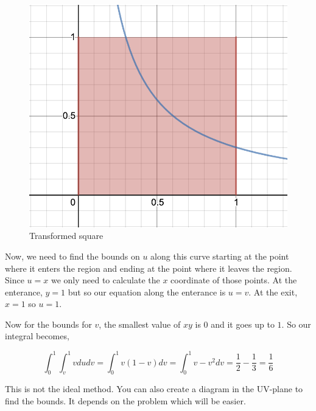 \begin{figure}[ht!]
    \centering
    \includegraphics[scale=0.5]{./images/lecture_14_figure_4.png}
    \caption{Transformed square}
\end{figure}

\pagebreak

Now, we need to find the bounds on $u$ along this curve starting at the point where it enters the region
and ending at the point where it leaves the region.
Since $u = x$ we only need to calculate the $x$ coordinate of those points.
At the enterance, $y = 1$ but  so our equation along the enterance is $u = v$.
At the exit, $x = 1$ so  $u = 1$.

Now for the bounds for $v$, the smallest value of $xy$ is $0$ and it goes up to $1$.
So our integral becomes, 

$$
\int_0^1 \int_v^1 v du dv  
    = \int_0^1 v(1-v) dv 
    = \int_0^1 v - v^2 dv 
    = \frac{1}{2} - \frac{1}{3} 
    = \frac{1}{6}
$$

This is not the ideal method. You can also create a diagram in the UV-plane to find the bounds.
It depends on the problem which will be easier.
